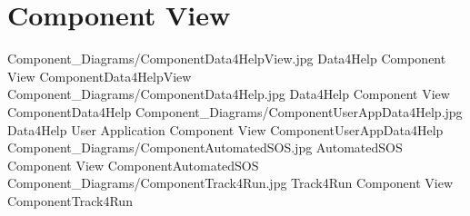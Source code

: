 \documentclass[../../DD.tex]{subfiles}
\begin{document}
\section{Component View}

	\image {13cm} {Component_Diagrams/ComponentData4HelpView.jpg} {Data4Help Component View} {ComponentData4HelpView}
	\image {13cm} {Component_Diagrams/ComponentData4Help.jpg} {Data4Help Component View} {ComponentData4Help}
	\image {13cm} {Component_Diagrams/ComponentUserAppData4Help.jpg} {Data4Help User Application Component View} {ComponentUserAppData4Help}
	\image {13cm} {Component_Diagrams/ComponentAutomatedSOS.jpg} {AutomatedSOS Component View} {ComponentAutomatedSOS}
	\image {13cm} {Component_Diagrams/ComponentTrack4Run.jpg} {Track4Run Component View} {ComponentTrack4Run}
	
\end{document}
